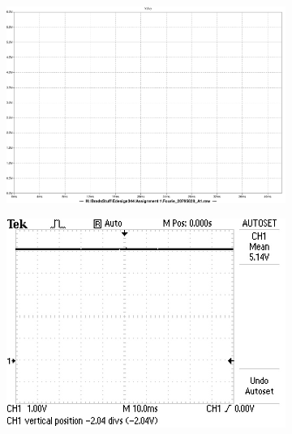 \begin{figure}
\begin{subfigure}[]{0.35\textwidth}
		   \caption{ } \label{subfig:pwr_meas_rect}
     \end{subfigure}
    \begin{subfigure}[]{0.35\textwidth}
              \centering
  		\includegraphics[width=1\linewidth]{./Figures/pwr_simu_rails_pos.pdf}
		    \caption{} \label{subfig:pwr_simu_rails_pos}
     \end{subfigure}
    \begin{subfigure}[]{0.35\textwidth}
              \centering
  		\includegraphics[width=1\linewidth]{./Figures/pwr_meas_rails_pos.JPG}
		    \caption{} \label{subfig:pwr_meas_rails_pos}
     \end{subfigure}
    \begin{subfigure}[]{0.35\textwidth}
             \centering

\end{subfigure}
\end{figure}
